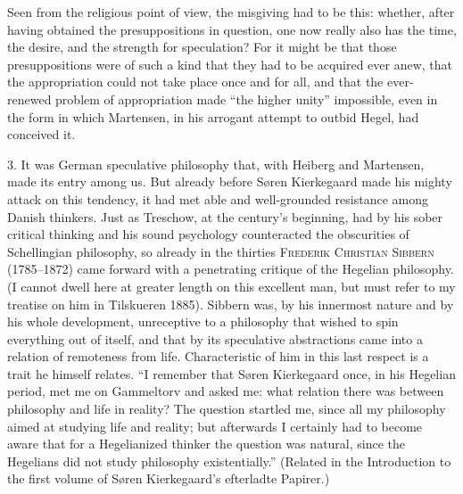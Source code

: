 \documentclass[12pt,a4paper]{book}
\newcommand{\opage}[1]{\marginnote{\footnotesize\textit{[#1]}}}
\begin{document}
Seen from the religious point of view, the misgiving had to be this:
whether, after having obtained the presuppositions in question, one now
really also has the time, the desire, and the strength for speculation? For
it might be that those presuppositions were of such a kind that they had to
be acquired ever anew, that the appropriation could not take place once
\opage{21}and for all, and that the ever-renewed problem of appropriation made
``the higher unity'' impossible, even in the form in which Martensen, in
his arrogant attempt to outbid Hegel, had conceived it.

3. It was German speculative philosophy that, with
Heiberg and Martensen, made its entry among us. But already before Søren
Kierkegaard made his mighty attack on this tendency, it had met able and
well-grounded resistance among Danish thinkers. Just as Treschow, at the
century's beginning, had by his sober critical thinking and his sound
psychology counteracted the obscurities of Schellingian philosophy, so
already in the thirties \textsc{Frederik Christian Sibbern} (1785--1872)
came forward with a penetrating critique of the Hegelian philosophy.
(I cannot dwell here at greater length on this excellent man, but must
refer to my treatise on him in Tilskueren 1885). Sibbern was,
by his innermost nature and by his whole development, unreceptive to a
philosophy that wished to spin everything out of itself, and that by its
speculative abstractions came into a relation of remoteness from life.
Characteristic of him in this last respect is a trait he himself relates.
``I remember that Søren Kierkegaard once, in his Hegelian period, met me on
Gammeltorv and asked me: what relation there was between philosophy and
life in reality? The question startled me, since all my philosophy aimed
at studying life and reality; but afterwards I certainly had to become
aware that for a Hegelianized thinker the question was natural, since the
Hegelians did not study philosophy existentially.''
(Related in the Introduction to the first volume of Søren Kierkegaard's
efterladte Papirer.)
\end{document}
